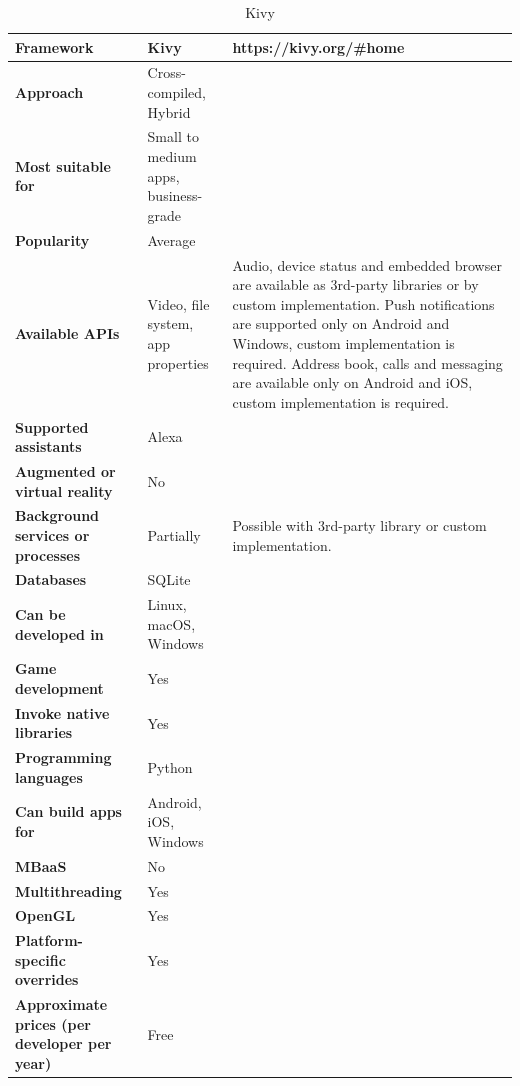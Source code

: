 \documentclass[english,master,public,dept460,male,cpdeclaration,oneside]{diploma}
\begin{document}
\begin{table}[!h]
	\centering
	\caption{Kivy}
	\begin{tabular}{p{} | p{} | p{}}
		\toprule		
		\textbf{Framework} & \textbf{Kivy} & https://kivy.org/\#home \\
		\midrule
		\textbf{Approach} & Cross-compiled, Hybrid & \\			
		\midrule	
		\textbf{Most suitable for} & Small to medium apps, business-grade & \\
		\midrule
		\textbf{Popularity} & Average & \\			
		\midrule
		\textbf{Available APIs} & Video, file system, app properties & Audio, device status and embedded browser are available as 3rd-party libraries or by custom implementation. Push notifications are supported only on Android and Windows, custom implementation is required. Address book, calls and messaging are available only on Android and iOS, custom implementation is required. \\			
		\midrule
		\textbf{Supported assistants} & Alexa & \\			
		\midrule
		\textbf{Augmented or virtual reality} & No & \\			
		\midrule
		\textbf{Background services or processes} & Partially & Possible with 3rd-party library or custom implementation. \\			
		\midrule
		\textbf{Databases} & SQLite & \\			
		\midrule
		\textbf{Can be developed in} & Linux, macOS, Windows &  \\			
		\midrule
		\textbf{Game development} & Yes & \\			
		\midrule
		\textbf{Invoke native libraries} & Yes & \\			
		\midrule
		\textbf{Programming languages} & Python & \\			
		\midrule
		\textbf{Can build apps for} & Android, iOS, Windows & \\			
		\midrule
		\textbf{MBaaS} & No & \\			
		\midrule
		\textbf{Multithreading} & Yes & \\			
		\midrule
		\textbf{OpenGL} & Yes & \\			
		\midrule
		\textbf{Platform-specific overrides} & Yes & \\			
		\midrule
		\textbf{Approximate prices (per developer per year)} & Free & \\			
		\midrule
	\end{tabular}
\end{table}
\end{document}
